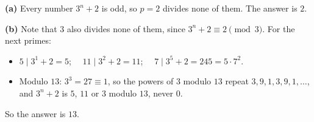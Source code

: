 \textbf{(a)} Every number $3^n+2$ is odd, so $p=2$ divides none of them. The answer is $\boxed{2}$.

\textbf{(b)} Note that $3$ also divides none of them, since $3^n+2\equiv2\pmod3$. For the next primes:
\begin{itemize}
\item $5\mid3^1+2=5$; $\quad11\mid3^2+2=11$; $\quad7\mid3^5+2=245=5\cdot7^2$.
\item Modulo $13$: $3^3=27\equiv1$, so the powers of $3$ modulo $13$ repeat $3,9,1,3,9,1,\dots$, and $3^n+2$ is $5$, $11$ or $3$ modulo $13$, never $0$.
\end{itemize}
So the answer is $\boxed{13}$.
